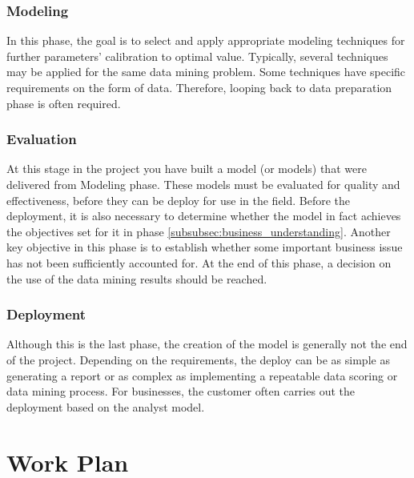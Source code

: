 \subsubsection{Modeling}

In this phase, the goal is to select and apply appropriate modeling techniques for further parameters' calibration to optimal value. Typically, several techniques may be applied for the same data mining problem. Some techniques have specific requirements on the form of data. Therefore, looping back to data preparation phase is often required.

\subsubsection{Evaluation}

At this stage in the project you have built a model (or models) that were delivered from Modeling phase. These models must be evaluated for quality and effectiveness, before they can be deploy for use in the field.
Before the deployment, it is also necessary to determine whether the model in fact achieves the objectives set for it in phase \ref{subsubsec:business_understanding}. Another key objective in this phase is to establish whether some important business issue has not been sufficiently accounted for. At the end of this phase, a decision on the use of the data mining results should be reached.

\subsubsection{Deployment}

Although this is the last phase, the creation of the model is generally not the end of the project. Depending on the requirements, the deploy can be as simple as generating a report or as complex as implementing a repeatable data scoring or data mining process. For businesses, the customer often carries out the deployment based on the analyst model.


\section{Work Plan} %
\label{sec:work_plan}

